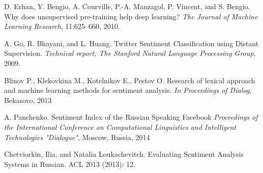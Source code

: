 \documentclass[12pt,a4paper]{article}
\begin{document}
\begin{thebibliography}{9}
D. Erhan, Y. Bengio, A. Courville, P.-A. Manzagol, P. Vincent, and S. Bengio. Why does unsupervised pre-training help deep learning? 
\textit{The Journal of Machine Learning Research}, 11:625–660, 2010.

A. Go, R. Bhayani, and L. Huang. Twitter Sentiment Classification using Distant Supervision. 
\textit{Technical report, The Stanford Natural Language Processing Group}, 2009.

Blinov P.,  Klekovkina M.,  Kotelnikov E.,  Pestov O.  Research of lexical approach and machine learning methods for sentiment analysis. 
\textit{In Proceedings of Dialog}, Bekasovo, 2013 

A. Panchenko. Sentiment Index of the Russian Speaking Facebook
\textit{Proceedings of the International Conference on Computational Linguistics and Intelligent Technologies "Dialogue"}, Moscow, Russia, 2014

Chetviorkin, Ilia, and Natalia Loukachevitch.  Evaluating Sentiment Analysis Systems in Russian. ACL 2013 (2013): 12.

\end{thebibliography}
\end{document}
